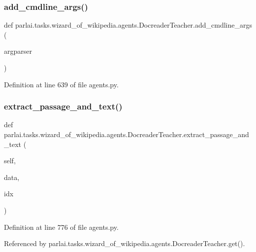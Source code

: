 \subsubsection{\texorpdfstring{add\+\_\+cmdline\+\_\+args()}{add\_cmdline\_args()}}
{\footnotesize\ttfamily def parlai.\+tasks.\+wizard\+\_\+of\+\_\+wikipedia.\+agents.\+Docreader\+Teacher.\+add\+\_\+cmdline\+\_\+args (\begin{DoxyParamCaption}\item[{}]{argparser }\end{DoxyParamCaption})\hspace{0.3cm}{\ttfamily [static]}}



Definition at line 639 of file agents.\+py.

\mbox{\label{classparlai_1_1tasks_1_1wizard__of__wikipedia_1_1agents_1_1DocreaderTeacher_ae91935a6b1c7e904a125d8e4a9033407}} 
\subsubsection{\texorpdfstring{extract\+\_\+passage\+\_\+and\+\_\+text()}{extract\_passage\_and\_text()}}
{\footnotesize\ttfamily def parlai.\+tasks.\+wizard\+\_\+of\+\_\+wikipedia.\+agents.\+Docreader\+Teacher.\+extract\+\_\+passage\+\_\+and\+\_\+text (\begin{DoxyParamCaption}\item[{}]{self,  }\item[{}]{data,  }\item[{}]{idx }\end{DoxyParamCaption})}



Definition at line 776 of file agents.\+py.



Referenced by parlai.\+tasks.\+wizard\+\_\+of\+\_\+wikipedia.\+agents.\+Docreader\+Teacher.\+get().

